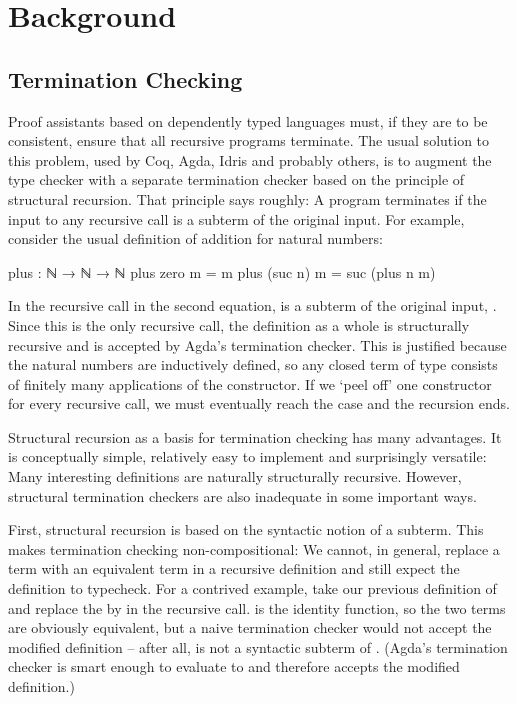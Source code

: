 \chapter{Background}
\label{sec:background}


\section{Termination Checking}
\label{sec:background:termination}

Proof assistants based on dependently typed languages must, if they are to be
consistent, ensure that all recursive programs terminate. The usual solution to
this problem, used by Coq, Agda, Idris and probably others, is to augment the
type checker with a separate termination checker based on the principle of
structural recursion. That principle says roughly: A program terminates if the
input to any recursive call is a subterm of the original input. For example,
consider the usual definition of addition for natural numbers:
\begin{code}
  plus : ℕ → ℕ → ℕ
  plus zero    m = m
  plus (suc n) m = suc (plus n m)
\end{code}

In the recursive call in the second equation,  is a subterm of the
original input, . Since this is the only recursive call, the
definition as a whole is structurally recursive and is accepted by Agda's
termination checker. This is justified because the natural numbers are
inductively defined, so any closed term of type  consists of finitely
many applications of the  constructor. If we \enquote*{peel off} one
constructor for every recursive call, we must eventually reach the 
case and the recursion ends.

Structural recursion as a basis for termination checking has many advantages. It
is conceptually simple, relatively easy to implement and surprisingly versatile:
Many interesting definitions are naturally structurally recursive. However,
structural termination checkers are also inadequate in some important ways.

First, structural recursion is based on the syntactic notion of a subterm. This
makes termination checking non-compositional: We cannot, in general, replace a
term with an equivalent term in a recursive definition and still expect the
definition to typecheck. For a contrived example, take our previous definition
of  and replace the  by  in the recursive call.
 is the identity function, so the two terms are obviously equivalent,
but a naive termination checker would not accept the modified definition --
after all,  is not a syntactic subterm of . (Agda's
termination checker is smart enough to evaluate  to  and
therefore accepts the modified definition.)

